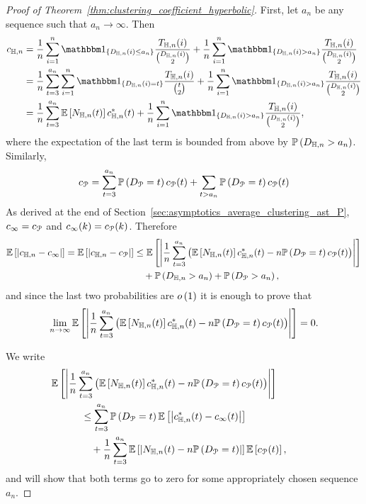 \begin{proof}[Proof of Theorem~\ref{thm:clustering_coefficient_hyperbolic}]

First, let $a_n$ be any sequence such that $a_n \to \infty$. Then
\begin{align*}
	c_{\H,n} &= \frac{1}{n} \sum_{i = 1}^n \ind{D_{\H,n}(i) \le a_n} \frac{T_{\H,n}(i)}{\binom{D_{\H,n}(i)}{2}}
		+ \frac{1}{n} \sum_{i = 1}^n \ind{D_{\H,n}(i) > a_n} \frac{T_{\H,n}(i)}{\binom{D_{\H,n}(i)}{2}}\\
	&= \frac{1}{n} \sum_{t = 3}^{a_n} \sum_{i = 1}^n \ind{D_{\H,n}(i) = t} \frac{T_{\H,n}(i)}{\binom{t}{2}}
		+ \frac{1}{n} \sum_{i = 1}^n \ind{D_{\H,n}(i) > a_n} \frac{T_{\H,n}(i)}{\binom{D_{\H,n}(i)}{2}}\\
	&= \frac{1}{n} \sum_{t = 3}^{a_n} \Exp{N_{\H,n}(t)} c_{\H,n}^\ast(t)
		+ \frac{1}{n} \sum_{i = 1}^n \ind{D_{\H,n}(i) > a_n} \frac{T_{\H,n}(i)}{\binom{D_{\H,n}(i)}{2}},
\end{align*}
where the expectation of the last term is bounded from above by $\mathbb{P}\left(D_{\mathbb{H},n} > a_n\right)$. Similarly,
\[
	c_{{\mathcal P}} = \sum_{t = 3}^{a_n} \mathbb{P}\left(D_{{\mathcal P}} = t\right) c_{{\mathcal P}}(t) + \sum_{t > a_n} \mathbb{P}\left(D_{{\mathcal P}} = t\right) c_{{\mathcal P}}(t)
\]
As derived at the end of Section~\ref{sec:asymptotics_average_clustering_ast_P}, $c_\infty = c_{{\mathcal P}}$ and $c_\infty(k) = c_{{\mathcal P}}(k)$. Therefore
\begin{align*}
	\mathbb{E}\left[|c_{\mathbb{H},n}-c_\infty|\right]=\mathbb{E}\left[|c_{\mathbb{H},n} - c_{{\mathcal P}}|\right]
	&\le \mathbb{E}\left[\left|\frac{1}{n} \sum_{t = 3}^{a_n} \left(\mathbb{E}\left[N_{\mathbb{H},n}(t)\right] c_{\mathbb{H},n}^\ast(t) - 	
		n \mathbb{P}\left(D_{{\mathcal P}} = t\right)c_{{\mathcal P}}(t)\right)\right|\right]\\ 
	&\hspace{10pt}+ \mathbb{P}\left(D_{\mathbb{H},n} > a_n\right) + \mathbb{P}\left(D_{{\mathcal P}} > a_n\right),
\end{align*}
and since the last two probabilities are $o\left(1\right)$ it is enough to prove that
\[
	\lim_{n \to \infty} \mathbb{E}\left[\left|\frac{1}{n} \sum_{t = 3}^{a_n} \left(\mathbb{E}\left[N_{\mathbb{H},n}(t)\right] c_{\mathbb{H},n}^\ast(t) - 	
			n \mathbb{P}\left(D_{{\mathcal P}} = t\right)c_{{\mathcal P}}(t)\right)\right|\right] = 0.
\]

We write
\begin{align*}
	&\hspace{-30pt}\Exp{\left|\frac{1}{n} \sum_{t = 3}^{a_n} \left(\Exp{N_{\H,n}(t)} c_{\H,n}^\ast(t) - 	
		n \Prob{D_\Pcal = t}c_\Pcal(t)\right)\right|}\\
	&\le \sum_{t = 3}^{a_n} \Prob{D_\Pcal = t} \Exp{\left|c_{\H,n}^\ast(t) - c_{\infty}(t)\right|}\\
	&\hspace{10pt}+ \frac{1}{n} \sum_{t = 3}^{a_n} \Exp{\left|N_{\H,n}(t) - n \Prob{D_\Pcal = t}\right|}\Exp{c_\Pcal(t)},
\end{align*}
and will show that both terms go to zero for some appropriately chosen sequence $a_n$.


\end{proof}
